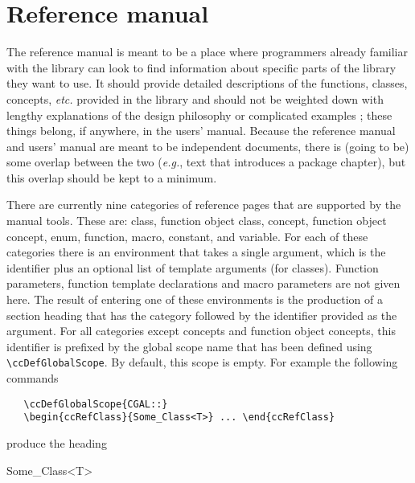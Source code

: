 \section{Reference manual}
\label{sec:ref_manual}

The reference manual is meant to be a place where programmers already
familiar with the library can look to find information about specific
parts of the library they want to use.  It should provide detailed
descriptions of the functions, classes, concepts, {\em etc.} provided
in the library and should not be weighted down with lengthy explanations
of the design philosophy or complicated examples
;  these things belong,
if anywhere, in the
users' manual.  Because the reference manual and users' manual are meant
to be independent documents, there is (going to be) some overlap between 
the two ({\em e.g.}, text that introduces a package chapter),
but this overlap should be kept to a minimum.   

There are currently nine categories of reference pages that are supported by 
the manual tools.  These are: class, function object class, concept, 
function object concept, enum, function, macro, constant, and 
variable.  For each of these categories there is an environment that takes
a single argument, which is the identifier plus an optional list of 
template arguments (for classes).  Function parameters, function template
declarations and macro parameters are not given here.  The result of entering
one of these environments is the production of a section heading that
has the category followed by the identifier provided as the argument.  
For all categories except concepts and function object concepts, this 
identifier is prefixed by the
global scope name that has been defined using \verb|\ccDefGlobalScope|.%
By default, this scope is empty.  For example the following commands
\begin{verbatim}
   \ccDefGlobalScope{CGAL::}
   \begin{ccRefClass}{Some_Class<T>} ... \end{ccRefClass}
\end{verbatim}

produce the heading

\ccAutoIndexingOff
\ccHtmlNoClassToc
\ccHtmlNoIndex
\begin{ccRefClass}{Some_Class<T>} \end{ccRefClass}
\ccAutoIndexingOn

